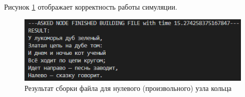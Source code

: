 Рисунок \ref{circle-res} отображает корректность работы симуляции.

\begin{figure}[H]
    \centering
    \includegraphics[width=0.88\linewidth]{imgs/circle-res.png}
    \caption{Результат сборки файла для нулевого (произвольного) узла кольца}
    \label{circle-res}
\end{figure}

